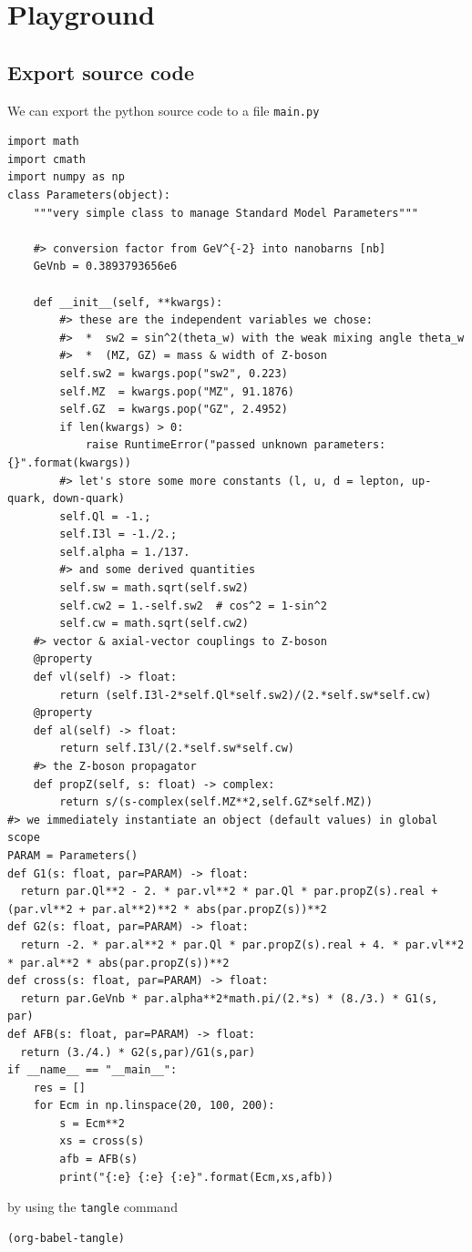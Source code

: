 \documentclass[11pt]{article}
\begin{document}
\section{Playground}
\label{sec:org4d83650}

\subsection{Export source code}
\label{sec:org4c1fc7d}
We can export the python source code to a file \texttt{main.py}
\begin{verbatim}
import math
import cmath
import numpy as np
class Parameters(object):
    """very simple class to manage Standard Model Parameters"""

    #> conversion factor from GeV^{-2} into nanobarns [nb]
    GeVnb = 0.3893793656e6

    def __init__(self, **kwargs):
        #> these are the independent variables we chose:
        #>  *  sw2 = sin^2(theta_w) with the weak mixing angle theta_w
        #>  *  (MZ, GZ) = mass & width of Z-boson
        self.sw2 = kwargs.pop("sw2", 0.223)
        self.MZ  = kwargs.pop("MZ", 91.1876)
        self.GZ  = kwargs.pop("GZ", 2.4952)
        if len(kwargs) > 0:
            raise RuntimeError("passed unknown parameters: {}".format(kwargs))
        #> let's store some more constants (l, u, d = lepton, up-quark, down-quark)
        self.Ql = -1.;
        self.I3l = -1./2.;
        self.alpha = 1./137.
        #> and some derived quantities
        self.sw = math.sqrt(self.sw2)
        self.cw2 = 1.-self.sw2  # cos^2 = 1-sin^2
        self.cw = math.sqrt(self.cw2)
    #> vector & axial-vector couplings to Z-boson
    @property
    def vl(self) -> float:
        return (self.I3l-2*self.Ql*self.sw2)/(2.*self.sw*self.cw)
    @property
    def al(self) -> float:
        return self.I3l/(2.*self.sw*self.cw)
    #> the Z-boson propagator
    def propZ(self, s: float) -> complex:
        return s/(s-complex(self.MZ**2,self.GZ*self.MZ))
#> we immediately instantiate an object (default values) in global scope
PARAM = Parameters()
def G1(s: float, par=PARAM) -> float:
  return par.Ql**2 - 2. * par.vl**2 * par.Ql * par.propZ(s).real + (par.vl**2 + par.al**2)**2 * abs(par.propZ(s))**2
def G2(s: float, par=PARAM) -> float:
  return -2. * par.al**2 * par.Ql * par.propZ(s).real + 4. * par.vl**2 * par.al**2 * abs(par.propZ(s))**2
def cross(s: float, par=PARAM) -> float:
  return par.GeVnb * par.alpha**2*math.pi/(2.*s) * (8./3.) * G1(s, par)
def AFB(s: float, par=PARAM) -> float:
  return (3./4.) * G2(s,par)/G1(s,par)
if __name__ == "__main__":
    res = []
    for Ecm in np.linspace(20, 100, 200):
        s = Ecm**2
        xs = cross(s)
        afb = AFB(s)
        print("{:e} {:e} {:e}".format(Ecm,xs,afb))
\end{verbatim}
by using the \texttt{tangle} command
\begin{verbatim}
(org-babel-tangle)
\end{verbatim}
\end{document}
